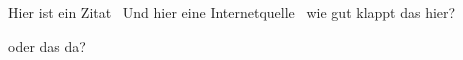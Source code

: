 \documentclass{article}
\begin{document}
Hier ist ein Zitat~\cite{GellMann.1964}
Und hier eine Internetquelle~\cite{Wikipedia.Standardmodell}
wie gut klappt das hier?~\cite{Zweig.1964}

oder das da?~\cite{Aaij.2019}




\end{document}
